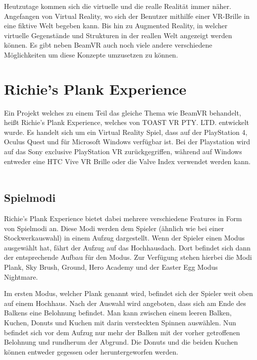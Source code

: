 %

Heutzutage kommen sich die virtuelle und die realle Realität immer näher.
Angefangen von Virtual Reality, wo sich der Benutzer mithilfe einer VR-Brille in eine fiktive Welt begeben kann.
Bis hin zu Augmented Reality, in welcher virtuelle Gegenstände und Strukturen in der reallen Welt angezeigt werden können.
Es gibt neben BeamVR auch noch viele andere verschiedene M\"oglichkeiten um diese Konzepte umzusetzen zu können.
\cite{Jabil_FutureOfARVR_2021}


\section{Richie's Plank Experience}
\label{sec:richiesplankexperience}
Ein Projekt welches zu einem Teil das gleiche Thema wie BeamVR behandelt, heißt Richie's Plank Experience, welches von TOAST VR PTY. LTD. entwickelt wurde.
Es handelt sich um ein Virtual Reality Spiel, dass auf der PlayStation 4, Oculus Quest und f\"ur Microsoft Windows verf\"ugbar ist.
Bei der Playstation wird auf das Sony exclusive PlayStation VR zur\"uckgegriffen, während auf Windows entweder eine HTC Vive VR Brille oder die Valve Index verwendet werden kann.
~\cite{ToastGames_2021}

\subsection{Spielmodi}
\label{sec:richiesplankexperience_modes}
Richie's Plank Experience bietet dabei mehrere verschiedene Features in Form von Spielmodi an.
Diese Modi werden dem Spieler (\"ahnlich wie bei einer Stockwerkauswahl) in einem Aufzug dargestellt.
Wenn der Spieler einen Modus ausgewählt hat, fährt der Aufzug auf das Hochhausdach.
Dort befindet sich dann der entsprechende Aufbau für den Modus.
Zur Verfügung stehen hierbei die Modi Plank, Sky Brush, Ground, Hero Academy und der Easter Egg Modus Nightmare.
~\cite{ToastGames_2021_Steam}

Im ersten Modus, welcher Plank genannt wird, befindet sich der Spieler weit oben auf einem Hochhaus.
Nach der Auswahl wird angeboten, dass sich am Ende des Balkens eine Belohnung befindet.
Man kann zwischen einem leeren Balken, Kuchen, Donuts und Kuchen mit darin versteckten Spinnen auswählen.
Nun befindet sich vor dem Aufzug nur mehr der Balken mit der vorher getroffenen Belohnung und rundherum der Abgrund.
Die Donuts und die beiden Kuchen können entweder gegessen oder heruntergeworfen werden.
~\cite{ToastGames_2021_Steam}

